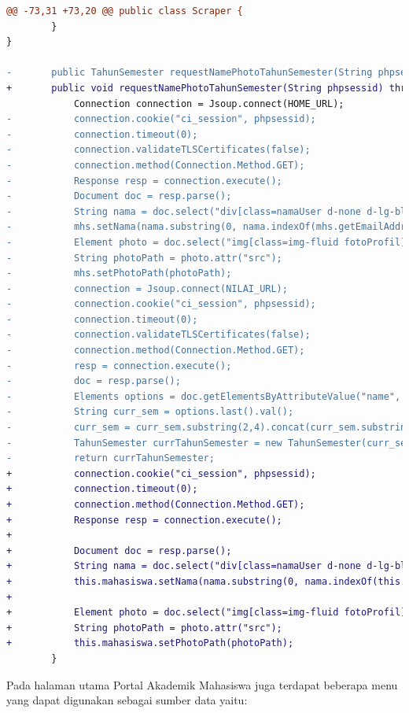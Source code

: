 \begin{lstlisting}[language=diff, caption=Perubahan Implementasi Jsoup Halaman Utama, label=diff_halaman_utama]
@@ -73,31 +73,20 @@ public class Scraper {
        }
}

-       public TahunSemester requestNamePhotoTahunSemester(String phpsessid, Mahasiswa mhs) throws IOException {
+       public void requestNamePhotoTahunSemester(String phpsessid) throws IOException {
            Connection connection = Jsoup.connect(HOME_URL);
-           connection.cookie("ci_session", phpsessid);
-           connection.timeout(0);
-           connection.validateTLSCertificates(false);
-           connection.method(Connection.Method.GET);
-           Response resp = connection.execute();
-           Document doc = resp.parse();
-           String nama = doc.select("div[class=namaUser d-none d-lg-block mr-3]").text();
-           mhs.setNama(nama.substring(0, nama.indexOf(mhs.getEmailAddress())));
-           Element photo = doc.select("img[class=img-fluid fotoProfil]").first();
-           String photoPath = photo.attr("src");
-           mhs.setPhotoPath(photoPath);
-           connection = Jsoup.connect(NILAI_URL);
-           connection.cookie("ci_session", phpsessid);
-           connection.timeout(0);
-           connection.validateTLSCertificates(false);
-           connection.method(Connection.Method.GET);
-           resp = connection.execute();
-           doc = resp.parse();
-           Elements options = doc.getElementsByAttributeValue("name", "dropdownSemester").first().children();
-           String curr_sem = options.last().val();
-           curr_sem = curr_sem.substring(2,4).concat(curr_sem.substring(5));
-           TahunSemester currTahunSemester = new TahunSemester(curr_sem);
-           return currTahunSemester;
+           connection.cookie("ci_session", phpsessid);
+           connection.timeout(0);
+           connection.method(Connection.Method.GET);
+           Response resp = connection.execute();
+
+           Document doc = resp.parse();
+           String nama = doc.select("div[class=namaUser d-none d-lg-block mr-3]").text();
+           this.mahasiswa.setNama(nama.substring(0, nama.indexOf(this.mahasiswa.getEmailAddress())));
+
+           Element photo = doc.select("img[class=img-fluid fotoProfil]").first();
+           String photoPath = photo.attr("src");
+           this.mahasiswa.setPhotoPath(photoPath);
        }
\end{lstlisting}

Pada halaman utama Portal Akademik Mahasiswa juga terdapat beberapa menu yang dapat digunakan sebagai sumber data yaitu:

